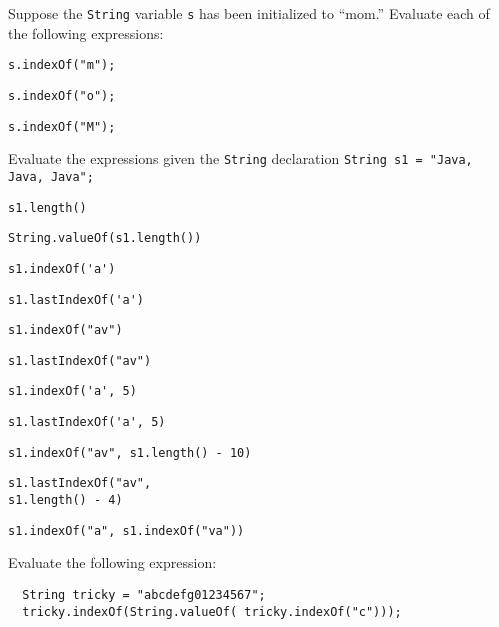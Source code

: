 \label{self-study-exercises}
\begin{SSTUDY}

\item  Suppose the {\tt String} variable {\tt s} has been
initialized to ``mom.'' Evaluate each of the following
expressions:

\begin{EXRLL}

\begin{multicols}{3}
\item  \verb|s.indexOf("m");|  
\item  \verb|s.indexOf("o");|  
\item  \verb|s.indexOf("M");|  
\end{multicols}

\end{EXRLL}

\item  Evaluate the  expressions given the {\tt String} declaration
\verb|String s1 = "Java, Java, Java";|

\begin{EXRLL}\columnsep=0pt
\scriptsize
\begin{multicols}{2}
\item  \verb|s1.length()|                      
\item  \verb|String.valueOf(s1.length())|      
\item  \verb|s1.indexOf('a')|                  
\item  \verb|s1.lastIndexOf('a')|              
\item  \verb|s1.indexOf("av")|                 
\item  \verb|s1.lastIndexOf("av")|           
\item  \verb|s1.indexOf('a', 5)|               
\item  \verb|s1.lastIndexOf('a', 5)|           
\item \verb|s1.indexOf("av", s1.length() - 10)|      
\item \verb|s1.lastIndexOf("av",| \\\verb|s1.length() - 4)|   
\item \verb|s1.indexOf("a", s1.indexOf("va"))|       
\end{multicols}
\normalsize
\end{EXRLL}

\item  Evaluate the following expression:

\begin{jjjlisting}
\begin{lstlisting}
  String tricky = "abcdefg01234567";
  tricky.indexOf(String.valueOf( tricky.indexOf("c")));
\end{lstlisting}
\end{jjjlisting}
\end{SSTUDY}

